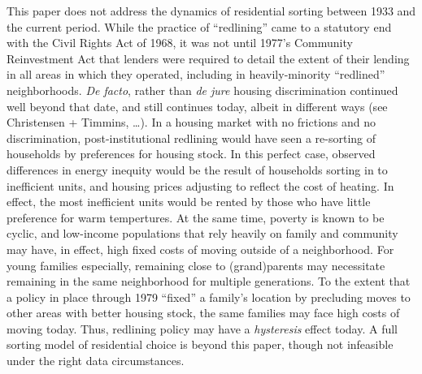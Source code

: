 \documentclass[
]{article}
\begin{document}
This paper does not address the dynamics of residential sorting between
1933 and the current period. While the practice of ``redlining'' came to
a statutory end with the Civil Rights Act of 1968, it was not until
1977's Community Reinvestment Act that lenders were required to detail
the extent of their lending in all areas in which they operated,
including in heavily-minority ``redlined'' neighborhoods. \emph{De
facto}, rather than \emph{de jure} housing discrimination continued well
beyond that date, and still continues today, albeit in different ways
(see Christensen + Timmins, \ldots). In a housing market with no
frictions and no discrimination, post-institutional redlining would have
seen a re-sorting of households by preferences for housing stock. In
this perfect case, observed differences in energy inequity would be the
result of households sorting in to inefficient units, and housing prices
adjusting to reflect the cost of heating. In effect, the most
inefficient units would be rented by those who have little preference
for warm tempertures. At the same time, poverty is known to be cyclic,
and low-income populations that rely heavily on family and community may
have, in effect, high fixed costs of moving outside of a neighborhood.
For young families especially, remaining close to (grand)parents may
necessitate remaining in the same neighborhood for multiple generations.
To the extent that a policy in place through 1979 ``fixed'' a family's
location by precluding moves to other areas with better housing stock,
the same families may face high costs of moving today. Thus, redlining
policy may have a \emph{hysteresis} effect today. A full sorting model
of residential choice is beyond this paper, though not infeasible under
the right data circumstances.
\end{document}

